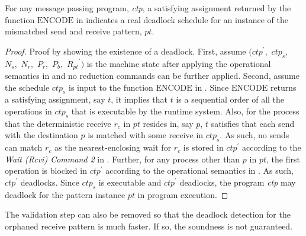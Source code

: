 \begin{lemma}
For any message passing program, \textit{ctp}, a satisfying assignment returned by the function $\mathrm{ENCODE}$ in  indicates a real deadlock schedule for an instance of the mismatched send and receive pattern, $\mathit{pt}$. 
\label{lemma:mismatch}
\end{lemma}
\begin{proof}
Proof by showing the existence of a deadlock. First, assume $(\mathit{ctp}^\prime,$ $\mathit{ctp}_s,$ $\mathit{N_s},$ $\mathit{N_r},$ $\mathit{P_r},$ $\mathit{P_b},$ $\mathit{R_{pt}}^\prime)$ is the machine state after applying the operational semantics in  and no reduction commands can be further applied. Second, assume the schedule $\mathit{ctp}_s$ is input to the function $\mathrm{ENCODE}$ in . Since $\mathrm{ENCODE}$ returns a satisfying assignment, say $\mathit{t}$, it implies that $\mathit{t}$ is a sequential order of all the operations in $\mathit{ctp}_s$ that is executable by the runtime system. Also, for the process that the deterministic receive $\mathit{r_c}$ in $\mathit{pt}$ resides in, say $\mathit{p}$, $\mathit{t}$ satisfies that each send with the destination $\mathit{p}$ is matched with some receive in $\mathit{ctp}_s$. As such, no sends can match $\mathit{r_c}$ as the nearest-enclosing wait for $\mathit{r_c}$ is stored in $\mathit{ctp}^\prime$ according to the \emph{Wait (Rcvi) Command 2} in . Further, for any process other than $\mathit{p}$ in $\mathit{pt}$, the first operation is blocked in $\mathit{ctp}^\prime$ according to the operational semantics in . As such, $\mathit{ctp}^\prime$ deadlocks. Since $\mathit{ctp}_s$ is executable and $\mathit{ctp}^\prime$ deadlocks, the program \textit{ctp} may deadlock for the pattern instance $\mathit{pt}$ in program execution. 
\end{proof}

The validation step can also be removed so that the deadlock detection for the orphaned receive pattern is much faster. If so, the soundness is not guaranteed. 



